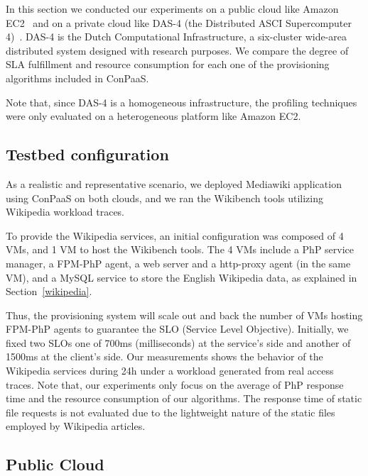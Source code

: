 In this section we conducted our experiments on a public cloud like Amazon EC2~\cite{amazonEC2} and on a private cloud like DAS-4 (the Distributed ASCI Supercomputer 4)~\cite{das4}. DAS-4 is the Dutch Computational Infrastructure, a six-cluster wide-area distributed system designed with research purposes.  We compare the degree of SLA fulfillment and resource consumption for each one of the provisioning algorithms included in ConPaaS.

Note that, since DAS-4 is a homogeneous infrastructure, the profiling techniques were only evaluated on a heterogeneous platform like Amazon EC2. 


\subsection{Testbed configuration}

As a realistic and representative scenario, we deployed Mediawiki application using ConPaaS on both clouds, and we ran the Wikibench tools utilizing Wikipedia workload traces.  

To provide the Wikipedia services, an initial configuration was composed of 4 VMs, and 1 VM to host the Wikibench tools. The 4 VMs include a PhP service manager, a FPM-PhP agent, a web server and a http-proxy agent (in the same VM), and a MySQL service to store the English Wikipedia data, as explained in Section~\ref{wikipedia}.

Thus, the provisioning system will scale out and back the number of VMs hosting FPM-PhP agents to guarantee the SLO (Service Level Objective). Initially, we fixed two SLOs one of 700ms (milliseconds) at the service's side and another of 1500ms at the client's side. Our measurements shows the behavior of the Wikipedia services during 24h under a workload generated from real access traces. Note that, our experiments only focus on the average of PhP response time and the resource consumption of our algorithms. The response time of static file requests is not evaluated due to the lightweight nature of the static files employed by Wikipedia articles. 

\subsection{Public Cloud}

